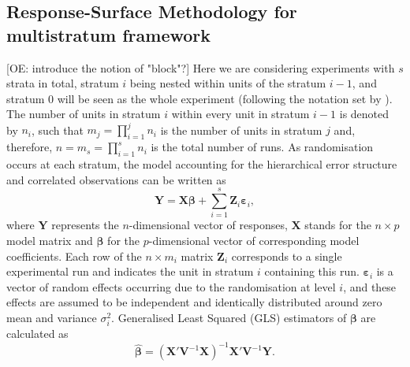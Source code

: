 \subsection{Response-Surface Methodology for multistratum framework}
[OE: introduce the notion of "block"?]
Here we are considering experiments with $s$ strata in total, stratum $i$ being nested within units of the stratum $i-1$, and stratum $0$ will be seen as the whole experiment (following the notation set by \citet{Trinca2015improved}). The number of units in stratum $i$ within every unit in stratum $i-1$ is denoted by $n_i$, such that $m_{j}=\prod_{i=1}^{j}n_{i}$ is the number of units in stratum $j$ and, therefore,  $n=m_{s}=\prod_{i=1}^{s}n_{i}$ is the total number of runs. As randomisation occurs at each stratum, the model accounting for the hierarchical error structure and correlated observations can be written as
\begin{equation}
\label{eq::MS_model}
\bm{Y}=\bm{X}\bm{\beta}+\sum_{i=1}^{s}\bm{Z}_{i}\bm{\varepsilon}_{i},
\end{equation}
where $\bm{Y}$ represents the $n$-dimensional vector of responses, $\bm{X}$ stands for the $n \times p$ model matrix and $\bm{\beta}$ for the $p$-dimensional vector of corresponding model coefficients. Each row of the $n\times m_{i}$ matrix $\bm{Z}_{i}$ corresponds to a single experimental run and indicates the unit in stratum $i$ containing this run. $\bm{\varepsilon}_{i}$ is a vector of random effects occurring due to the randomisation at level $i$, and these effects are assumed to be independent and identically distributed around zero mean and variance $\sigma^{2}_{i}$. Generalised Least Squared  (GLS) estimators of $\bm{\beta}$ are calculated as
\begin{equation}
\label{eq::MS_GLS}
\bm{\hat{\beta}}=(\bm{X}'\bm{V}^{-1}\bm{X})^{-1}\bm{X}'\bm{V}^{-1}\bm{Y}.
\end{equation}



